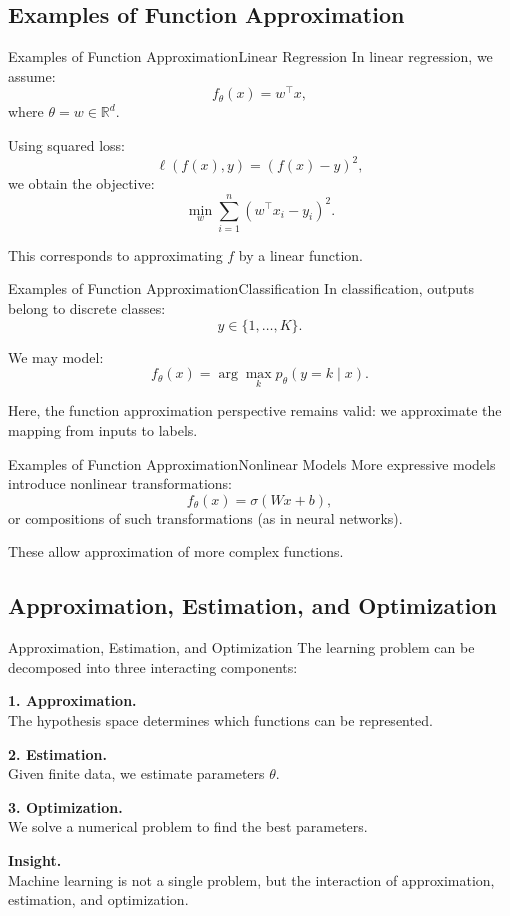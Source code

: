 \documentclass[aspectratio=169,11pt]{beamer}
\begin{document}
\subsection{Examples of Function Approximation}
\begin{frame}[t,allowframebreaks]{Examples of Function Approximation}{Linear Regression}
\small
In linear regression, we assume:
\[
f_\theta(x) = w^\top x,
\]
where $\theta = w \in \mathbb{R}^d$.

Using squared loss:
\[
\ell(f(x), y) = (f(x) - y)^2,
\]
we obtain the objective:
\[
\min_w \sum_{i=1}^n (w^\top x_i - y_i)^2.
\]

This corresponds to approximating $f$ by a linear function.
\end{frame}

\begin{frame}[t,allowframebreaks]{Examples of Function Approximation}{Classification}
\small
In classification, outputs belong to discrete classes:
\[
y \in \{1, \dots, K\}.
\]

We may model:
\[
f_\theta(x) = \arg\max_k p_\theta(y = k \mid x).
\]

Here, the function approximation perspective remains valid: we approximate the mapping from inputs to labels.
\end{frame}

\begin{frame}[t,allowframebreaks]{Examples of Function Approximation}{Nonlinear Models}
\small
More expressive models introduce nonlinear transformations:
\[
f_\theta(x) = \sigma(Wx + b),
\]
or compositions of such transformations (as in neural networks).

These allow approximation of more complex functions.
\end{frame}

\subsection{Approximation, Estimation, and Optimization}
\begin{frame}[t,allowframebreaks]{Approximation, Estimation, and Optimization}
\small
The learning problem can be decomposed into three interacting components:

\textbf{1. Approximation.}\\ The hypothesis space determines which functions can be represented.

\textbf{2. Estimation.}\\ Given finite data, we estimate parameters $\theta$.

\textbf{3. Optimization.}\\ We solve a numerical problem to find the best parameters.

\textbf{Insight.}\\ Machine learning is not a single problem, but the interaction of approximation, estimation, and optimization.
\end{frame}
\end{document}
